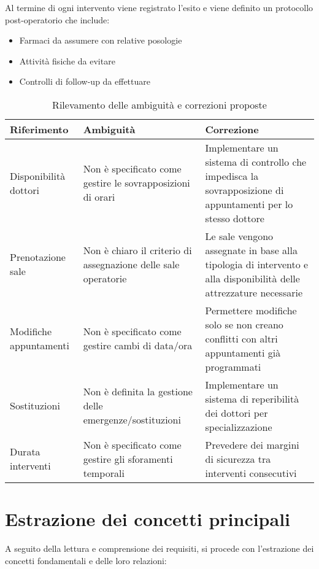 \documentclass[12pt,a4paper]{report}
\begin{document}
Al termine di ogni intervento viene registrato l'esito e viene definito un protocollo post-operatorio che include:
\begin{itemize}
\item Farmaci da assumere con relative posologie
\item Attività fisiche da evitare
\item Controlli di follow-up da effettuare
\end{itemize}

\begin{table}[H]
\caption{Rilevamento delle ambiguità e correzioni proposte}
\begin{tabular}{p{3cm}p{6cm}p{6cm}}
\toprule
\textbf{Riferimento} & \textbf{Ambiguità} & \textbf{Correzione} \\
\midrule
Disponibilità dottori & Non è specificato come gestire le sovrapposizioni di orari & Implementare un sistema di controllo che impedisca la sovrapposizione di appuntamenti per lo stesso dottore \\
\midrule
Prenotazione sale & Non è chiaro il criterio di assegnazione delle sale operatorie & Le sale vengono assegnate in base alla tipologia di intervento e alla disponibilità delle attrezzature necessarie \\
\midrule
Modifiche appuntamenti & Non è specificato come gestire cambi di data/ora & Permettere modifiche solo se non creano conflitti con altri appuntamenti già programmati \\
\midrule
Sostituzioni & Non è definita la gestione delle emergenze/sostituzioni & Implementare un sistema di reperibilità dei dottori per specializzazione \\
\midrule
Durata interventi & Non è specificato come gestire gli sforamenti temporali & Prevedere dei margini di sicurezza tra interventi consecutivi \\
\bottomrule
\end{tabular}
\end{table}

\section{Estrazione dei concetti principali}
A seguito della lettura e comprensione dei requisiti, si procede con l'estrazione dei concetti fondamentali e delle loro relazioni:
\end{document}
